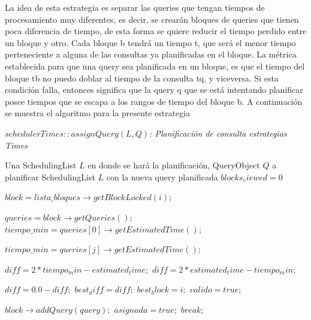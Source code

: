 La idea de esta estrategia es separar las queries que tengan tiempos de procesamiento muy diferentes, es decir, se crearán bloques de queries que tienen poca diferencia de tiempo, de esta forma se quiere reducir el tiempo perdido entre un bloque y otro. Cada bloque b tendrá un tiempo t, que será el menor tiempo perteneciente a alguna de las consultas ya planificadas en el bloque. La métrica establecida para que una query sea planificada en un bloque, es que el tiempo del bloque tb no puedo doblar al tiempo de la consulta tq, y viceversa. Si esta condición falla, entonces significa que la query q que se está intentando planificar posee tiempos que se escapa a los rangos de tiempo del bloque b. A continuación se muestra el algoritmo para la presente estrategia

\begin{algorithm}[!th]
\caption{\em $schedulerTimes::assignQuery(L, Q)$: Planificación de consulta estrategias Times}
\label{alg:times}
\begin{algorithmic}[1]
\REQUIRE Una SchedulingList $L$ en donde se hará la planificación, QueryObject $Q$ a planificar
\ENSURE SchedulingList $L$ con la nueva query planificada
	\STATE $blocks_viewed = 0$
	
		\STATE $block = lista\_bloques \rightarrow getBlockLocked(i);$
		
			\STATE $queries = block \rightarrow getQueries();$
			\STATE $tiempo\_min = queries[0] \rightarrow getEstimatedTime();$
			
					\STATE $tiempo\_min = queries[j] \rightarrow getEstimatedTime();$
				\ENDIF
			\ENDFOR
			
				\STATE $diff = 2*tiempo_min - estimated_time;$
			\ELSE
				\STATE $diff = 2*estimated_time - tiempo_min;$
			\ENDIF
			
				\STATE $diff = 0.0-diff;$
					\STATE $best_diff = diff;$
					\STATE $best_block = i;$
				\ENDIF
			\ELSE
				\STATE $valido = true;$
			\ENDIF
			
				\STATE $block \rightarrow addQuery(query);$
				\STATE $asignada = true;$
				\STATE $break;$
			\ENDIF
			

\end{algorithmic}
\end{algorithm}
